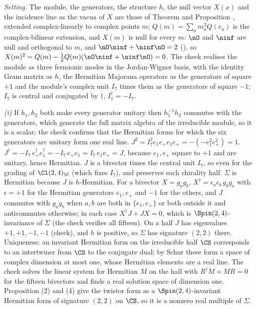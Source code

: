 \emph{Setting.} The module, the generators, the structure $h$, the null vector $X(x)$ and the incidence line as the vacua of $X$ are those of Theorem  and Proposition , extended complex-linearly to complex points $m$; $Q(m) = \sum_{a} m_{a}^{2}Q(e_{a})$ is the complex-bilinear extension, and $X(m)$ is null for every $m$: $\nO$ and $\ninf$ are null and orthogonal to $m$, and $\nO\ninf + \ninf\nO = 2$ (), so $X(m)^{2} = Q(m) - \tfrac12 Q(m)(\nO\ninf + \ninf\nO) = 0$. The check realises the module as three fermionic modes in the Jordan-Wigner basis, with the identity Gram matrix as $h$, the Hermitian Majorana operators as the generators of square $+1$ and the module's complex unit $I_{7}$ times them as the generators of square $-1$; $I_{7}$ is central and conjugated by $\dagger$, $I_{7}^{\dagger} = -I_{7}$.

\emph{(i)} If $h_{1}, h_{2}$ both make every generator unitary then $h_{1}^{-1}h_{2}$ commutes with the generators, which generate the full matrix algebra of the irreducible module, so it is a scalar; the check confirms that the Hermitian forms for which the six generators are unitary form one real line. $J^{2} = I_{7}^{2}e_{1}e_{+}e_{1}e_{+} = -(-e_{1}^{2}e_{+}^{2}) = 1$. $J^{\dagger} = -I_{7}\,e_{+}^{\dagger}e_{1}^{\dagger} = -I_{7}\,e_{+}e_{1} = I_{7}\,e_{1}e_{+} = J$, because $e_{1}, e_{+}$ square to $+1$ and are unitary, hence Hermitian. $J$ is a bivector times the central unit $I_{7}$, so even for the grading of $\Cl(2,4)_{\C}$ (which fixes $I_{7}$), and preserves each chirality half. $\Sigma$ is Hermitian because $J$ is $h$-Hermitian. For a bivector $X = g_{a}g_{b}$, $X^{\dagger} = \epsilon_{a}\epsilon_{b}\,g_{b}g_{a}$ with $\epsilon = +1$ for the Hermitian generators $e_{1}, e_{+}$ and $-1$ for the others, and $J$ commutes with $g_{a}g_{b}$ when $a, b$ are both in $\{e_{1}, e_{+}\}$ or both outside it and anticommutes otherwise; in each case $X^{\dagger}J + JX = 0$, which is $\Spin(2,4)$-invariance of $\Sigma$ (the check verifies all fifteen). On a half $J$ has eigenvalues $+1, +1, -1, -1$ (check), and $h$ is positive, so $\Sigma$ has signature $(2,2)$ there. Uniqueness: an invariant Hermitian form on the irreducible half $\CS$ corresponds to an intertwiner from $\CS$ to the conjugate dual; by Schur these form a space of complex dimension at most one, whose Hermitian elements are a real line. The check solves the linear system for Hermitian $M$ on the half with $R^{\dagger}M + MR = 0$ for the fifteen bivectors and finds a real solution space of dimension one. Proposition (2) and (4) give the twistor form as a $\Spin(2,4)$-invariant Hermitian form of signature $(2,2)$ on $\CS$, so it is a nonzero real multiple of $\Sigma$.

